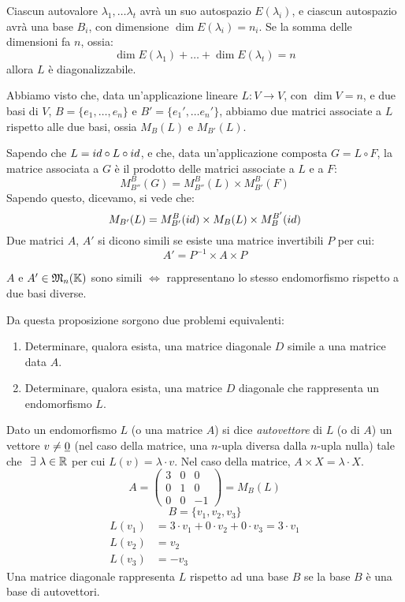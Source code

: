 Ciascun autovalore $\lambda_1, \ldots \lambda_t$ avr\`a un suo autospazio $E(\lambda_i)$, e ciascun autospazio avr\`a una base $B_i$, con dimensione $\dim E(\lambda_i) = n_i$. Se la somma delle dimensioni fa $n$, ossia:
\[
\dim E(\lambda_1) + \ldots + \dim E(\lambda_t) = n
\]
allora $L$ \`e diagonalizzabile.

Abbiamo visto che, data un'applicazione lineare $L : V \to V$, con $\dim V = n$, e due basi di $V$, $B = \{ e_1, \ldots, e_n \}$ e $B' = \{ e_1', \ldots e_{n}' \}$, abbiamo due matrici associate a $L$ rispetto alle due basi, ossia $M_{B}(L)$ e $M_{B'}(L)$.

Sapendo che $L = id \circ L \circ id$, e che, data un'applicazione composta $G = L \circ F$, la matrice associata a $G$ \`e il prodotto delle matrici associate a $L$ e a $F$:
\[
M_{B''}^{B} (G) = M_{B''}^{B} (L) \times M_{B'}^{B} (F)
\]
Sapendo questo, dicevamo, si vede che:
\[
M_{B'} (L) = M_{B'}^{B} ( id ) \times M_{B} (L) \times M_{B}^{B'} (id)
\]
Due matrici $A$, $A'$ si dicono simili se esiste una matrice invertibili $P$ per cui:
\[
A' = P^{-1} \times A \times P
\]
\begin{prop}
$A$ e $A' \in \mathfrak{M}_{n} (\mathbb{K})$ sono simili $\iff$ rappresentano lo stesso endomorfismo rispetto a due basi diverse.
\end{prop}
Da questa proposizione sorgono due problemi equivalenti:
\begin{enumerate}
    \item Determinare, qualora esista, una matrice diagonale $D$ simile a una matrice data $A$.
    \item Determinare, qualora esista, una matrice $D$ diagonale che rappresenta un endomorfismo $L$.
\end{enumerate}

Dato un endomorfismo $L$ (o una matrice $A$) si dice \emph{autovettore} di $L$ (o di $A$) un vettore $v \neq \underline{0}$ (nel caso della matrice, una $n$-upla diversa dalla $n$-upla nulla) tale che $\exists \lambda \in \reals$ per cui $L(v) = \lambda \cdot v$. Nel caso della matrice, $A \times X = \lambda \cdot X$.
\[
A =
\begin{pmatrix}
3 & 0 & 0 \\ 
0 & 1 & 0 \\
0 & 0 & -1
\end{pmatrix}
=
M_B(L)
\]
\[
B = \{ v_1, v_2, v_3 \}
\]
\begin{align*}
L(v_1) &= 3 \cdot v_1 + 0 \cdot v_2 + 0 \cdot v_3 = 3 \cdot v_1 \\
L(v_2) &= v_2 \\
L(v_3) &= - v_3
\end{align*}
Una matrice diagonale rappresenta $L$ rispetto ad una base $B$ se la base $B$ \`e una base di autovettori.

